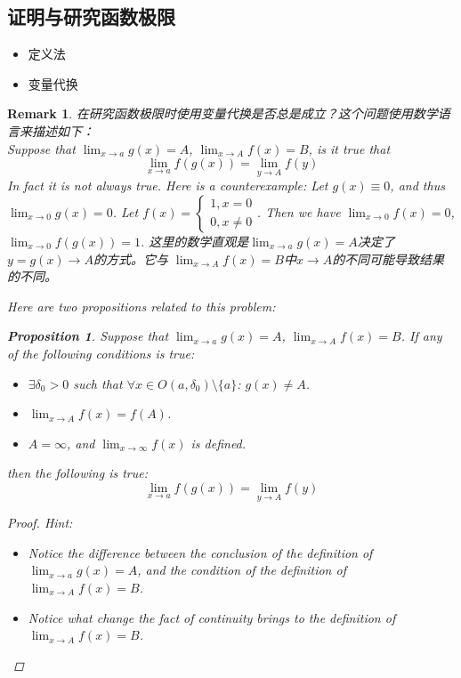\documentclass[onecolumn]{ctexart}
\newtheorem{proposition}{Proposition}
\newtheorem{remark}{Remark}
\begin{document}
\subsection{证明与研究函数极限}

\begin{itemize}
  \item 定义法
  \item 变量代换
\end{itemize}

\begin{remark}
  在研究函数极限时使用变量代换是否总是成立？这个问题使用数学语言来描述如下：\\
  Suppose that $\lim_{x \to a} g(x) = A$, $\lim_{x \to A} f(x) = B$, is it true that 
  \[
    \lim_{x \to a} f(g(x)) = \lim_{y \to A} f(y)
  \]
  In fact it is not always true. Here is a counterexample: Let $g(x) \equiv 0$, 
  and thus $\lim_{x \to 0} g(x) = 0$. Let $f(x) = 
  \begin{cases}
    1, x = 0 \\
    0, x \neq 0
  \end{cases}$. Then we have $\lim_{x \to 0} f(x) = 0$, $\lim_{x \to 0} f(g(x)) 
  = 1$. 这里的数学直观是$\lim_{x \to a} g(x) = A$决定了$y = g(x) \to A$的方式。它与
  $\lim_{x \to A} f(x) = B$中$x \to A$的不同可能导致结果的不同。

  Here are two propositions related to this problem:
  \begin{proposition}
    Suppose that $\lim_{x \to a} g(x) = A$, $\lim_{x \to A} f(x) = B$. If any of 
    the following conditions is true:
    \begin{itemize}
      \item $\exists \delta_0 > 0$ such that $\forall x \in O(a, \delta_0) 
      \setminus \{a\}$: $g(x) \neq A$.
      \item $\lim_{x \to A} f(x) = f(A)$.
      \item $A = \infty$, and $\lim_{x \to \infty} f(x)$ is defined.
    \end{itemize}
    then the following is true:
    \[
      \lim_{x \to a} f(g(x)) = \lim_{y \to A} f(y)
    \]
  \end{proposition}
  \begin{proof}
    Hint:
    \begin{itemize}
      \item Notice the difference between the conclusion of the definition of 
      $\lim_{x \to a} g(x) = A$, and the condition of the definition of 
      $\lim_{x \to A} f(x) = B$.
      \item Notice what change the fact of continuity brings to the definition 
      of $\lim_{x \to A} f(x) = B$.
    \end{itemize}
  \end{proof}


\end{remark}
\end{document}
